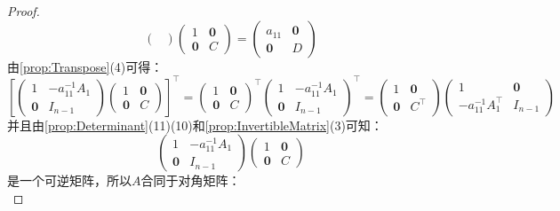 \begin{proof}
\begin{equation*}
\begin{pmatrix}
		\end{pmatrix}
		\begin{pmatrix}
			1 & \mathbf{0} \\
			\mathbf{0} & C
		\end{pmatrix}
		=
		\begin{pmatrix}
			a_{11} & \mathbf{0} \\
			\mathbf{0} & D
		\end{pmatrix}
	\end{equation*}
	由\cref{prop:Transpose}(4)可得：
	\begin{equation*}
		\left[
		\begin{pmatrix}
			1 & -a_{11}^{-1}A_1 \\
			\mathbf{0} & I_{n-1}
		\end{pmatrix}
		\begin{pmatrix}
			1 & \mathbf{0} \\
			\mathbf{0} & C
		\end{pmatrix}
		\right]^{\top}
		=
		\begin{pmatrix}
			1 & \mathbf{0} \\
			\mathbf{0} & C
		\end{pmatrix}^{\top}
		\begin{pmatrix}
			1 & -a_{11}^{-1}A_1 \\
			\mathbf{0} & I_{n-1}
		\end{pmatrix}^{\top}
		=
		\begin{pmatrix}
			1 & \mathbf{0} \\
			\mathbf{0} & C^{\top}
		\end{pmatrix}
		\begin{pmatrix}
			1 & \mathbf{0} \\
			-a_{11}^{-1}A_1^{\top} & I_{n-1}
		\end{pmatrix}
	\end{equation*}
	并且由\cref{prop:Determinant}(11)(10)和\cref{prop:InvertibleMatrix}(3)可知：
	\begin{equation*}
		\begin{pmatrix}
			1 & -a_{11}^{-1}A_1 \\
			\mathbf{0} & I_{n-1}
		\end{pmatrix}
		\begin{pmatrix}
			1 & \mathbf{0} \\
			\mathbf{0} & C
		\end{pmatrix}
	\end{equation*}
	是一个可逆矩阵，所以$A$合同于对角矩阵：
	\begin{equation*}

\end{equation*}
\end{proof}
